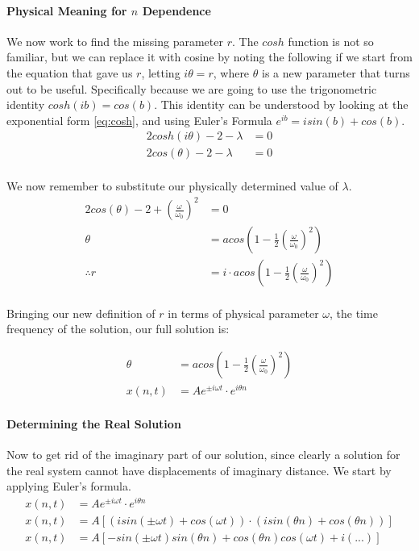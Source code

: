 \documentclass{article}
\begin{document}
	\paragraph{Physical Meaning for $n$ Dependence}
	We now work to find the missing parameter $r$. The $cosh$ function is not so familiar, but we can replace it with cosine by noting the following if we start from the equation that gave us $r$, letting $i\theta = r$, where $\theta$ is a new parameter that turns out to be useful. Specifically because we are going to use the trigonometric identity $cosh(ib) = cos(b)$. This identity can be understood by looking at the exponential form \eqref{eq:cosh}, and using Euler's Formula $e^{ib} = isin(b) + cos(b)$.
	\begin{align}
		2cosh(i\theta) - 2 - \lambda &= 0\\
		2cos(\theta) - 2 - \lambda &= 0
	\end{align}
	\paragraph{}
	We now remember to substitute our physically determined value of $\lambda$.
	\begin{align}
		2cos(\theta) - 2 + (\frac{\omega}{\omega_{0}})^{2} &= 0\\
		\theta &= acos(1 - \frac{1}{2}(\frac{\omega}{\omega_{0}})^{2})\\
		\therefore r &= i\cdot acos(1 - \frac{1}{2}(\frac{\omega}{\omega_{0}})^{2})
	\end{align}
	\paragraph{}
		Bringing our new definition of $r$ in terms of physical parameter $\omega$, the time frequency of the solution, our full solution is:
		
	\begin{align}
		\theta &= acos(1 - \frac{1}{2}(\frac{\omega}{\omega_{0}})^{2})\\
		x(n,t) &= Ae^{\pm i \omega t} \cdot e^{i\theta n}
	\end{align}
	\paragraph{Determining the Real Solution}
	Now to get rid of the imaginary part of our solution, since clearly a solution for the real system cannot have displacements of imaginary distance. We start by applying Euler's formula.
	\begin{align}
		x(n,t) &= Ae^{\pm i \omega t} \cdot e^{i\theta n}\\
		x(n,t) &= A[(isin(\pm \omega t) + cos(\omega t)) \cdot (isin(\theta n) + cos(\theta n))]\\
			x(n,t) &= A[-sin(\pm \omega t)sin(\theta n) + cos(\theta n)cos(\omega t) + i(...)]
		\end{align}
\end{document}
